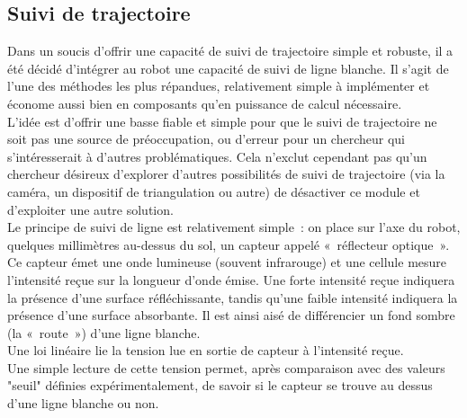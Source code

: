 \subsection{Suivi de trajectoire}

Dans un soucis d’offrir une capacité de suivi de trajectoire simple et robuste, il a été décidé d’intégrer au robot une capacité de suivi de ligne blanche. Il s’agit de l’une des méthodes les plus répandues, relativement simple à implémenter et économe aussi bien en composants qu’en puissance de calcul nécessaire.\\

L’idée est d’offrir une basse fiable et simple pour que le suivi de trajectoire ne soit pas une source de préoccupation, ou d’erreur pour un chercheur qui s’intéresserait à d’autres problématiques. Cela n’exclut cependant pas qu’un chercheur désireux d’explorer d’autres possibilités de suivi de trajectoire (via la caméra, un dispositif de triangulation ou autre) de désactiver ce module et d’exploiter une autre solution.\\

Le principe de suivi de ligne est relativement simple : on place sur l’axe du robot, quelques millimètres au-dessus du sol, un capteur appelé « réflecteur optique ». Ce capteur émet une onde lumineuse (souvent infrarouge) et une cellule mesure l’intensité reçue sur la longueur d’onde émise. Une forte intensité reçue indiquera la présence d’une surface réfléchissante, tandis qu’une faible intensité indiquera la présence d’une surface absorbante. Il est ainsi aisé de différencier un fond sombre (la « route ») d’une ligne blanche.\\

Une loi linéaire lie la tension lue en sortie de capteur à l'intensité reçue.\\
Une simple lecture de cette tension permet, après comparaison avec des valeurs "seuil" définies expérimentalement, de savoir si le capteur se trouve au dessus d'une ligne blanche ou non.\\

